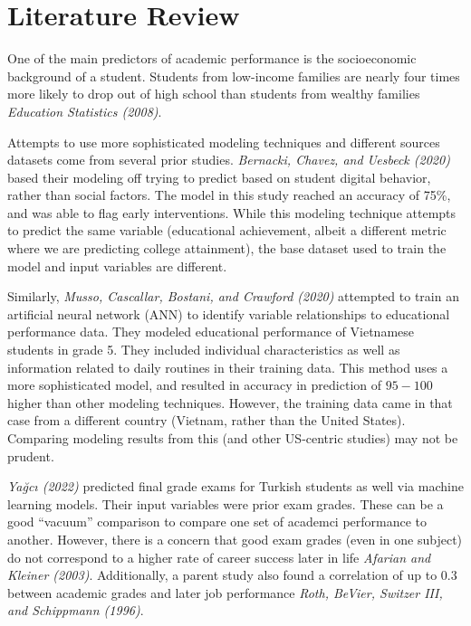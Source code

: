 \documentclass[
  man]{apa6}
\begin{document}
\hypertarget{literature-review}{%
\section{Literature Review}\label{literature-review}}

One of the main predictors of academic performance is the socioeconomic background of a student. Students from low-income families are nearly four times more likely to drop out of high school than students from wealthy families \emph{Education Statistics (2008)}.

Attempts to use more sophisticated modeling techniques and different sources datasets come from several prior studies. \emph{Bernacki, Chavez, and Uesbeck (2020)} based their modeling off trying to predict based on student digital behavior, rather than social factors. The model in this study reached an accuracy of 75\%, and was able to flag early interventions. While this modeling technique attempts to predict the same variable (educational achievement, albeit a different metric where we are predicting college attainment), the base dataset used to train the model and input variables are different.

Similarly, \emph{Musso, Cascallar, Bostani, and Crawford (2020)} attempted to train an artificial neural network (ANN) to identify variable relationships to educational performance data. They modeled educational performance of Vietnamese students in grade 5. They included individual characteristics as well as information related to daily routines in their training data. This method uses a more sophisticated model, and resulted in accuracy in prediction of \(95-100%
\) higher than other modeling techniques. However, the training data came in that case from a different country (Vietnam, rather than the United States). Comparing modeling results from this (and other US-centric studies) may not be prudent.

\emph{Yağcı (2022)} predicted final grade exams for Turkish students as well via machine learning models. Their input variables were prior exam grades. These can be a good ``vacuum'' comparison to compare one set of academci performance to another. However, there is a concern that good exam grades (even in one subject) do not correspond to a higher rate of career success later in life \emph{Afarian and Kleiner (2003)}. Additionally, a parent study also found a correlation of up to 0.3 between academic grades and later job performance \emph{Roth, BeVier, Switzer III, and Schippmann (1996)}.
\end{document}
